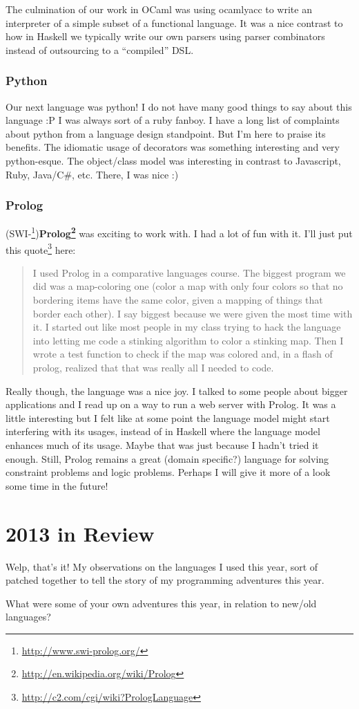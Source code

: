 \documentclass[]{article}
\renewcommand{\href}[2]{#2\footnote{\url{#1}}}
\begin{document}
The culmination of our work in OCaml was using ocamlyacc to write an
interpreter of a simple subset of a functional language. It was a nice
contrast to how in Haskell we typically write our own parsers using
parser combinators instead of outsourcing to a ``compiled'' DSL.

\subsubsection{Python}\label{python}

Our next language was python! I do not have many good things to say
about this language :P I was always sort of a ruby fanboy. I have a long
list of complaints about python from a language design standpoint. But
I'm here to praise its benefits. The idiomatic usage of decorators was
something interesting and very python-esque. The object/class model was
interesting in contrast to Javascript, Ruby, Java/C\#, etc. There, I was
nice :)

\subsubsection{Prolog}\label{prolog}

(\href{http://www.swi-prolog.org/}{SWI-})\textbf{\href{http://en.wikipedia.org/wiki/Prolog}{Prolog}}
was exciting to work with. I had a lot of fun with it. I'll just put
\href{http://c2.com/cgi/wiki?PrologLanguage}{this quote} here:

\begin{quote}
I used Prolog in a comparative languages course. The biggest program we
did was a map-coloring one (color a map with only four colors so that no
bordering items have the same color, given a mapping of things that
border each other). I say biggest because we were given the most time
with it. I started out like most people in my class trying to hack the
language into letting me code a stinking algorithm to color a stinking
map. Then I wrote a test function to check if the map was colored and,
in a flash of prolog, realized that that was really all I needed to
code.
\end{quote}

Really though, the language was a nice joy. I talked to some people
about bigger applications and I read up on a way to run a web server
with Prolog. It was a little interesting but I felt like at some point
the language model might start interfering with its usages, instead of
in Haskell where the language model enhances much of its usage. Maybe
that was just because I hadn't tried it enough. Still, Prolog remains a
great (domain specific?) language for solving constraint problems and
logic problems. Perhaps I will give it more of a look some time in the
future!

\section{2013 in Review}\label{in-review}

Welp, that's it! My observations on the languages I used this year, sort
of patched together to tell the story of my programming adventures this
year.

What were some of your own adventures this year, in relation to new/old
languages?
\end{document}
